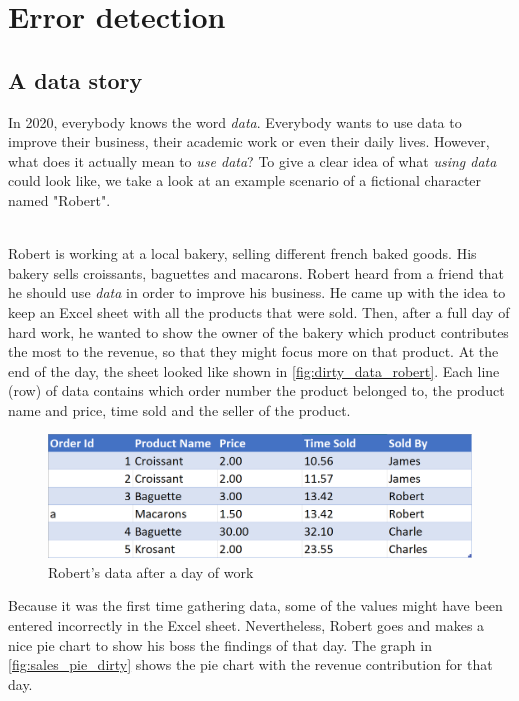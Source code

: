 \section{Error detection}
\label{sec:errordetection_intro}
\subsection{A data story}
\label{subsec:data_story}
In 2020, everybody knows the word \textit{data}. Everybody wants to use data to improve their business, their academic work or even their daily lives. However, what does it actually mean to \textit{use data}? To give a clear idea of what \textit{using data} could look like, we take a look at an example scenario of a fictional character named "Robert". 

~\\Robert is working at a local bakery, selling different french baked goods. His bakery sells croissants, baguettes and macarons. Robert heard from a friend that he should use \textit{data} in order to improve his business. He came up with the idea to keep an Excel sheet with all the products that were sold. Then, after a full day of hard work, he wanted to show the owner of the bakery which product contributes the most to the revenue, so that they might focus more on that product. 
At the end of the day, the sheet looked like shown in \autoref{fig:dirty_data_robert}. Each line (row) of data contains which order number the product belonged to, the product name and price, time sold and the seller of the product.

\begin{figure}
    \centering
    \includegraphics[width=0.9\linewidth]{thesis/Figures/DirtyDataset.png}
    \caption{Robert's data after a day of work}
    \label{fig:dirty_data_robert}
\end{figure}

Because it was the first time gathering data, some of the values might have been entered incorrectly in the Excel sheet. Nevertheless, Robert goes and makes a nice pie chart to show his boss the findings of that day. The graph in \autoref{fig:sales_pie_dirty} shows the pie chart with the revenue contribution for that day.

